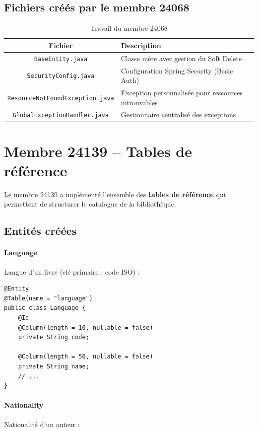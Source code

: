 \documentclass[12pt,a4paper,twoside]{report}
\begin{document}
\subsection{Fichiers créés par le membre 24068}

\begin{table}[H]
\centering
\caption{Travail du membre 24068}
\begin{tabularx}{\textwidth}{c X}
\hline
\rowcolor[gray]{0.9}
\textbf{Fichier} & \textbf{Description} \\
\hline
\texttt{BaseEntity.java} & Classe mère avec gestion du Soft Delete \\
\texttt{SecurityConfig.java} & Configuration Spring Security (Basic Auth) \\
\texttt{ResourceNotFoundException.java} & Exception personnalisée pour ressources introuvables \\
\texttt{GlobalExceptionHandler.java} & Gestionnaire centralisé des exceptions \\
\hline
\end{tabularx}
\end{table}

\section{Membre 24139 -- Tables de référence}

Le membre 24139 a implémenté l'ensemble des \textbf{tables de référence} qui permettent de structurer le catalogue de la bibliothèque.

\subsection{Entités créées}

\paragraph{Language} Langue d'un livre (clé primaire : code ISO) :

\begin{lstlisting}[caption=Entité Language]
@Entity
@Table(name = "language")
public class Language {
    @Id
    @Column(length = 10, nullable = false)
    private String code;

    @Column(length = 50, nullable = false)
    private String name;
    // ...
}
\end{lstlisting}

\paragraph{Nationality} Nationalité d'un auteur :
\end{document}

